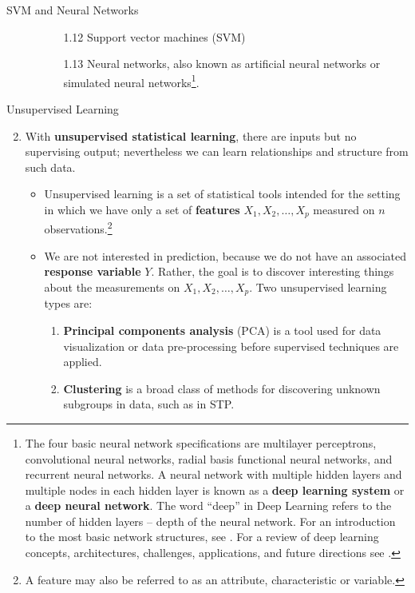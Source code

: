 \documentclass[pdf]{beamer}
\newcommand{\empr}[1]{{\color{franklinblue}\textbf{#1}}}
\theoremstyle{remark}
\theoremstyle{definition}
\begin{document}
\begin{frame}[t]{SVM and Neural Networks}
\begin{enumerate}
\item []
\begin{itemize}
\item []
\begin{enumerate}
\item [1.12] Support vector machines (SVM)
\item [1.13] Neural networks, also known as artificial neural networks or simulated neural networks\footnote{The four basic neural network specifications are multilayer perceptrons, convolutional neural networks, radial basis functional neural networks, and recurrent neural networks.  A neural network with multiple hidden layers and multiple nodes in each hidden layer is known as a \empr{deep learning system} or a \empr{deep neural network}.  The word ``deep'' in Deep Learning refers to the number of hidden layers -- depth of the neural network.  For an introduction to the most basic network structures, see \cite{james2021}. For a review of deep learning concepts,  architectures, challenges, applications, and future directions see \cite{alzubaidi2021beamerissue}.}. 
\end{enumerate}
\end{itemize}
\end{enumerate}
\end{frame}

\begin{frame}[t]{Unsupervised Learning}
\begin{enumerate}
  \setcounter{enumi}{1}
\item With \empr{unsupervised statistical learning}, there are inputs but no supervising output; nevertheless we can learn relationships and structure  from such data.
\begin{itemize}
\item Unsupervised learning is a set of statistical tools intended for the setting in which we have only a set of \empr{features} $X_1,X_2,\ldots, X_p$ measured on $n$ observations.\footnote{A feature may also be referred to as an attribute, characteristic or variable.} 
\item We are not interested in prediction, because we do not have an associated \empr{response variable} $Y$. Rather, the goal is to discover interesting things about the measurements on $X_1, X_2,\ldots,X_p$.  Two unsupervised learning types are:  
\begin{enumerate}
\item \empr{Principal components analysis} (PCA) is a tool used for data visualization or data pre-processing before supervised techniques are applied.
\item \empr{Clustering} is  a broad class of methods for discovering unknown subgroups in data, such as in STP.
\end{enumerate}
\end{itemize}
\end{enumerate}
\end{frame}
\end{document}
